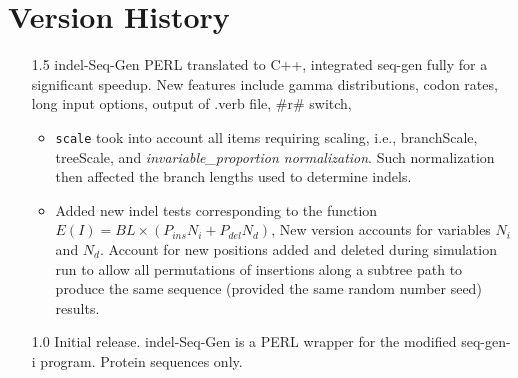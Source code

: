 \documentclass[10pt]{article}
\begin{document}
\newpage
\section{Version History}
\begin{itemize}
\item[1.5] indel-Seq-Gen PERL translated to C++, integrated seq-gen fully for a significant speedup. 
New features include gamma distributions, codon rates, long input options, output of .verb file,
\#r\# switch, 
  \begin{itemize}
  \item {\tt scale} took into account all items requiring scaling, i.e., branchScale, treeScale, and
    \emph{invariable_proportion normalization}. Such normalization then affected the branch lengths
    used to determine indels. 
  \item Added new indel tests corresponding to the function $E(I)=BL\times(P_{ins}N_i+P_{del}N_d)$,
    New version accounts for variables $N_i$ and $N_d$. Account for new positions added and deleted
    during simulation run to allow all permutations of insertions along a subtree path to produce 
    the same sequence (provided the same random number seed) results.
  \end{itemize}
\item[1.0] Initial release. indel-Seq-Gen is a PERL wrapper for the modified seq-gen-i program.
Protein sequences only.
\end{itemize}
\newpage


\end{document}
